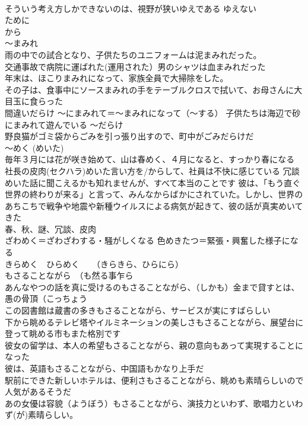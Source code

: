 \documentclass[8pt]{extreport}
\begin{document}
\begin{CJK}{UTF8}{min}
\\	そういう考え方しかできないのは、視野が狭いゆえである	ゆえない 
\\	ために 
\\	から 
\\	～まみれ	
\\	雨の中での試合となり、子供たちのユニフォームは泥まみれだった。 
\\	交通事故で病院に運ばれた(運用された）男のシャツは血まみれだった 
\\	年末は、ほこりまみれになって、家族全員で大掃除をした。 
\\	その子は、食事中にソースまみれの手をテーブルクロスで拭いて、お母さんに大目玉に食らった
\\	間違いだらけ	～にまみれて＝～まみれになって（～する） 子供たちは海辺で砂にまみれて遊んでいる ～だらけ 
\\	野良猫がゴミ袋からごみを引っ張り出すので、町中がごみだらけだ
\\	～めく (めいた)
\\	毎年３月には花が咲き始めて、山は春めく、４月になると、すっかり春になる 社長の皮肉(セクハラ)めいた言い方を/からして、社員は不快に感じている 冗談めいた話に聞こえるかも知れませんが、すべて本当のことです 彼は、「もう直ぐ世界の終わりが来る」と言って、みんなからばかにされていた。しかし、世界のあちこちで戦争や地震や新種ウイルスによる病気が起きて、彼の話が真実めいてきた	
\\	春、秋、謎、冗談、皮肉 
\\	ざわめく＝ざわざわする・騒がしくなる 色めきたつ＝緊張・興奮した様子になる　 
\\	きらめく　ひらめく　　（きらきら、ひらにら）
\\	もさることながら　（も然る事乍ら 
\\	あんなやつの話を真に受けるのもさることながら、（しかも）金まで貸すとは、愚の骨頂（こっちょう
\\	この図書館は蔵書の多きもさることながら、サービスが実にすばらしい 
\\	下から眺めるテレビ塔やイルミネーションの美しさもさることながら、展望台に登って眺める市もまた格別です 
\\	彼女の留学は、本人の希望もさることながら、親の意向もあって実現することになった 
\\	彼は、英語もさることながら、中国語もかなり上手だ 
\\	駅前にできた新しいホテルは、便利さもさることながら、眺めも素晴らしいので人気があるそうだ 
\\	あの女優は容貌（ようぼう）もさることながら、演技力といわず、歌唱力といわず(が)素晴らしい。

\end{CJK}
\end{document}
